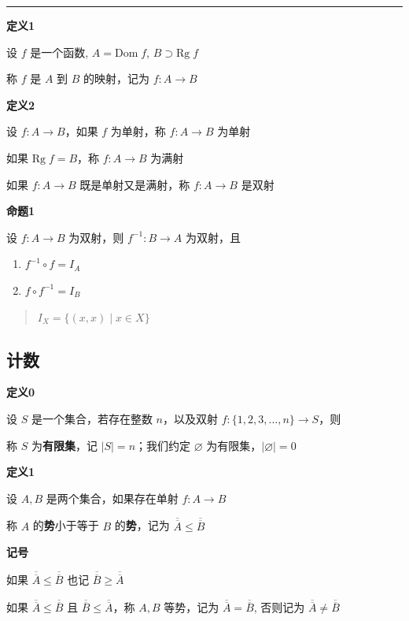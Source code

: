 \begin{center}\rule{0.5\linewidth}{0.5pt}\end{center}

\textbf{定义1}

设 \(f\) 是一个函数, \(A=\mathrm{Dom} \; f\),
\(B \supset \mathrm{Rg} \; f\)

称 \(f\) 是 \(A\) 到 \(B\) 的映射，记为 \(f:A \to B\)

\textbf{定义2}

设 \(f:A\to B\)，如果 \(f\) 为单射，称 \(f:A\to B\) 为单射

如果 \(\mathrm{Rg} \; f=B\)，称 \(f:A\to B\) 为满射

如果 \(f:A\to B\) 既是单射又是满射，称 \(f:A\to B\) 是双射

\textbf{命题1}

设 \(f:A\to B\) 为双射，则 \(f^{-1}:B\to A\) 为双射，且

\begin{enumerate}
\def\labelenumi{\arabic{enumi}.}
\tightlist
\item
  \(f^{-1} \circ f = I_{A}\)
\item
  \(f \circ f ^{-1} =I_{B}\)
\end{enumerate}

\begin{quote}
\(I_{X}=\{(x,x) \mid x \in X\}\)
\end{quote}

\subsection{计数}\label{ux8ba1ux6570}

\textbf{定义0}

设 \(S\) 是一个集合，若存在整数 \(n\)，以及双射
\(f:\{1, 2, 3, \dots,n\} \to S\)，则

称 \(S\) 为\textbf{有限集}，记 \(|S|=n\)；我们约定 \(\varnothing\)
为有限集，\(|\varnothing|=0\)

\textbf{定义1}

设 \(A, B\) 是两个集合，如果存在单射 \(f:A\to B\)

称 \(A\) 的\textbf{势}小于等于 \(B\) 的\textbf{势}，记为
\(\overline{\overline{A}}\leq \overline{\overline{B}}\)

\textbf{记号}

如果 \(\overline{\overline{A}}\leq \overline{\overline{B}}\) 也记
\(\overline{\overline{B}}\geq \overline{\overline{A}}\)

如果 \(\overline{\overline{A}}\leq \overline{\overline{B}}\) 且
\(\overline{\overline{B}}\leq \overline{\overline{A}}\)，称 \(A,B\)
等势，记为 \(\overline{\overline{A}}=\overline{\overline{B}}\), 否则记为
\(\overline{\overline{A}}\neq \overline{\overline{B}}\)

